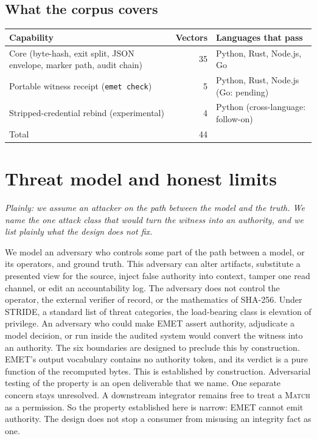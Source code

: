 \documentclass[11pt]{article}
\begin{document}
\subsection{What the corpus covers}

\begin{center}
\small
\begin{tabular}{lr l}
\toprule
Capability & Vectors & Languages that pass \\
\midrule
Core (byte-hash, exit split, JSON envelope, marker path, audit chain) & 35 & Python, Rust, Node.js, Go \\
Portable witness receipt (\texttt{emet check}) & 5 & Python, Rust, Node.js (Go: pending) \\
Stripped-credential rebind (experimental) & 4 & Python (cross-language: follow-on) \\
\midrule
Total & 44 & \\
\bottomrule
\end{tabular}
\end{center}

\section{Threat model and honest limits}
\emph{Plainly: we assume an attacker on the path between the model and the truth. We name the one attack class that would turn the witness into an authority, and we list plainly what the design does not fix.}

We model an adversary who controls some part of the path between a model, or its operators, and ground truth. This adversary can alter artifacts, substitute a presented view for the source, inject false authority into context, tamper one read channel, or edit an accountability log. The adversary does not control the operator, the external verifier of record, or the mathematics of SHA-256. Under STRIDE, a standard list of threat categories, the load-bearing class is elevation of privilege. An adversary who could make EMET assert authority, adjudicate a model decision, or run inside the audited system would convert the witness into an authority. The six boundaries are designed to preclude this by construction. EMET's output vocabulary contains no authority token, and its verdict is a pure function of the recomputed bytes. This is established by construction. Adversarial testing of the property is an open deliverable that we name. One separate concern stays unresolved. A downstream integrator remains free to treat a \textsc{Match} as a permission. So the property established here is narrow: EMET cannot emit authority. The design does not stop a consumer from misusing an integrity fact as one.
\end{document}
